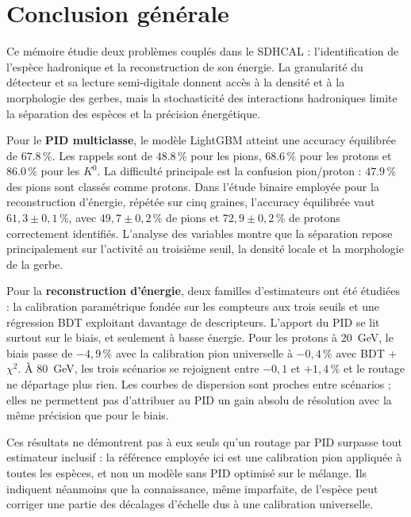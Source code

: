 \chapter*{Conclusion générale}
{}

Ce mémoire étudie deux problèmes couplés dans le SDHCAL : l'identification de l'espèce hadronique et la reconstruction de son énergie. La granularité du détecteur et sa lecture semi-digitale donnent accès à la densité et à la morphologie des gerbes, mais la stochasticité des interactions hadroniques limite la séparation des espèces et la précision énergétique.

Pour le \textbf{PID multiclasse}, le modèle LightGBM atteint une accuracy équilibrée de $67.8\,\%$. Les rappels sont de $48.8\,\%$ pour les pions, $68.6\,\%$ pour les protons et $86.0\,\%$ pour les $K^0$. La difficulté principale est la confusion pion/proton : $47.9\,\%$ des pions sont classés comme protons. Dans l'étude binaire employée pour la reconstruction d'énergie, répétée sur cinq graines, l'accuracy équilibrée vaut $61{,}3 \pm 0{,}1\,\%$, avec $49{,}7 \pm 0{,}2\,\%$ de pions et $72{,}9 \pm 0{,}2\,\%$ de protons correctement identifiés. L'analyse des variables montre que la séparation repose principalement sur l'activité au troisième seuil, la densité locale et la morphologie de la gerbe.

Pour la \textbf{reconstruction d'énergie}, deux familles d'estimateurs ont été étudiées : la calibration paramétrique fondée sur les compteurs aux trois seuils et une régression BDT exploitant davantage de descripteurs. L'apport du PID se lit surtout sur le biais, et seulement à basse énergie. Pour les protons à 20~GeV, le biais passe de $-4{,}9\,\%$ avec la calibration pion universelle à $-0{,}4\,\%$ avec BDT + $\chi^2$. À 80~GeV, les trois scénarios se rejoignent entre $-0{,}1$ et $+1{,}4\,\%$ et le routage ne départage plus rien. Les courbes de dispersion sont proches entre scénarios ; elles ne permettent pas d'attribuer au PID un gain absolu de résolution avec la même précision que pour le biais.

Ces résultats ne démontrent pas à eux seuls qu'un routage par PID surpasse tout estimateur inclusif : la référence employée ici est une calibration pion appliquée à toutes les espèces, et non un modèle sans PID optimisé sur le mélange. Ils indiquent néanmoins que la connaissance, même imparfaite, de l'espèce peut corriger une partie des décalages d'échelle dus à une calibration universelle.

